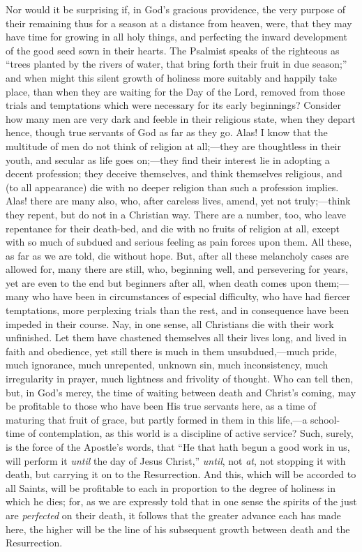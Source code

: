 Nor would it be surprising if, in God's gracious providence, the
very purpose of their remaining thus for a season at a distance from
heaven, were, that they may have time for growing in all holy things,
and perfecting the inward development of the good seed sown in their
hearts. The Psalmist speaks of the righteous as ``trees planted by
the rivers of water, that bring forth their fruit in due season;''
and when might this silent growth of holiness more suitably and
happily take place, than when they are waiting for the Day of the
Lord, removed from those trials and temptations which were necessary
for its early beginnings? Consider how many men are very dark and
feeble in their religious state, when they depart hence, though true
servants of God as far as they go. Alas! I know that the multitude of
men do not think of religion at all;—they are thoughtless in their
youth, and secular as life goes on;—they find their interest lie in
adopting a decent profession; they deceive themselves, and think
themselves religious, and (to all appearance) die with no deeper
religion than such a profession implies. Alas! there are many also,
who, after careless lives, amend, yet not truly;—think they repent,
but do not in a Christian way. There are a number, too, who leave
repentance for their death-bed, and die with no fruits of religion at
all, except with so much of subdued and serious feeling as pain forces
upon them. All these, as far as we are told, die without hope. But,
after all these melancholy cases are allowed for, many there are
still, who, beginning well, and persevering for years, yet are even to
the end but beginners after all, when death comes upon them;—many
who have been in circumstances of especial difficulty, who have had
fiercer temptations, more perplexing trials than the rest, and in
consequence have been impeded in their course. Nay, in one sense, all
Christians die with their work unfinished. Let them have chastened
themselves all their lives long, and lived in faith and obedience, yet
still there is much in them unsubdued,—much pride, much ignorance,
much unrepented, unknown sin, much inconsistency, much irregularity in
prayer, much lightness and frivolity of thought. Who can tell then,
but, in God's mercy, the time of waiting between death and Christ's
coming, may be profitable to those who have been His true servants
here, as a time of maturing that fruit of grace, but partly formed in
them in this life,—a school-time of contemplation, as this world is
a discipline of active service? Such, surely, is the force of the
Apostle's words, that ``He that hath begun a good work in us, will
perform it \emph{until} the day of Jesus Christ,'' \emph{until}, not \emph{at},
not stopping it with death, but carrying it on to the Resurrection.
And this, which will be accorded to all Saints, will be profitable to
each in proportion to the degree of holiness in which he dies; for, as
we are expressly told that in one sense the spirits of the just are \emph{perfected}
on their death, it follows that the greater advance each has made
here, the higher will be the line of his subsequent growth between
death and the Resurrection.

